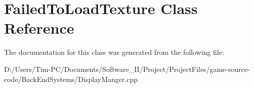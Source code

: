 \hypertarget{class_failed_to_load_texture}{}\section{Failed\+To\+Load\+Texture Class Reference}
\label{class_failed_to_load_texture}


The documentation for this class was generated from the following file\+:\begin{DoxyCompactItemize}
\item 
D\+:/\+Users/\+Tim-\/\+P\+C/\+Documents/\+Software\+\_\+\+I\+I/\+Project/\+Project\+Files/game-\/source-\/code/\+Back\+End\+Systems/Display\+Manger.\+cpp\end{DoxyCompactItemize}
